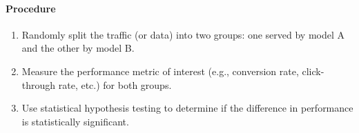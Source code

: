 \documentclass[english, threecolumn]{latex4ei/latex4ei_sheet}
\begin{document}
\begin{sectionbox}
    \paragraph{Procedure}
    \begin{enumerate}
        \item Randomly split the traffic (or data) into two groups: one served by model A and the other by model B.
        \item Measure the performance metric of interest (e.g., conversion rate, click-through rate, etc.) for both groups.
        \item Use statistical hypothesis testing to determine if the difference in performance is statistically significant.
    \end{enumerate}

\end{sectionbox}
\end{document}
